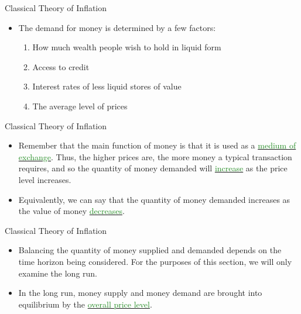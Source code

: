 \documentclass[xcolor={dvipsnames},pdf, hyperref={colorlinks=true, citecolor=ForestGreen, linkcolor=BlueViolet, urlcolor=Magenta}]{beamer}
\theoremstyle{definition}
\newcommand{\dd}[1]{{\underline{\textcolor{ForestGreen}{#1}}}}
\begin{document}
\begin{frame}{Classical Theory of Inflation}
\begin{itemize}

	\item The demand for money is determined by a few factors:
	\begin{enumerate}
		\item How much wealth people wish to hold in liquid form
		\item Access to credit
		\item Interest rates of less liquid stores of value
		\item The average level of prices 
	\end{enumerate}

\end{itemize}
\end{frame}

\begin{frame}{Classical Theory of Inflation}
	\begin{itemize}
		\item Remember that the main function of money is that it is used as a \dd{medium of exchange}. Thus, the higher prices are, the more money a typical transaction requires, and so the quantity of money demanded will \dd{increase} as the price level increases.
		\item Equivalently, we can say that the quantity of money demanded increases as the value of money \dd{decreases}.
	
	\end{itemize}
\end{frame}

\begin{frame}{Classical Theory of Inflation}
\begin{itemize}
	\item Balancing the quantity of money supplied and demanded depends on the time horizon being considered. For the purposes of this section, we will only examine the long run. 
	\item In the long run, money supply and money demand are brought into equilibrium by the \dd{overall price level}.
\end{itemize}
\end{frame}
\end{document}
